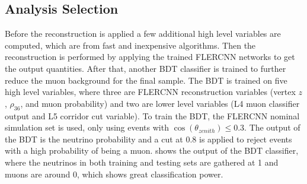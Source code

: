 



\subsection{Analysis Selection} 

Before the reconstruction is applied a few additional high level variables are computed, which are from fast and inexpensive algorithms. Then the reconstruction is performed by applying the trained FLERCNN networks to get the output quantities. After that, another BDT classifier is trained to further reduce the muon background for the final sample. The BDT is trained on five high level variables, where three are FLERCNN reconstruction variables (vertex $z$, $\rho_{36}$, and muon probability) and two are lower level variables (L4 muon classifier output and L5 corridor cut variable). To train the BDT, the FLERCNN nominal simulation set is used, only using events with $\cos(\theta_{zenith})\leq 0.3$. The output of the BDT is the neutrino probability and a cut at 0.8 is applied to reject events with a high probability of being a muon.  shows the output of the BDT classifier, where the neutrinos in both training and testing sets are gathered at 1 and muons are around 0, which shows great classification power.

